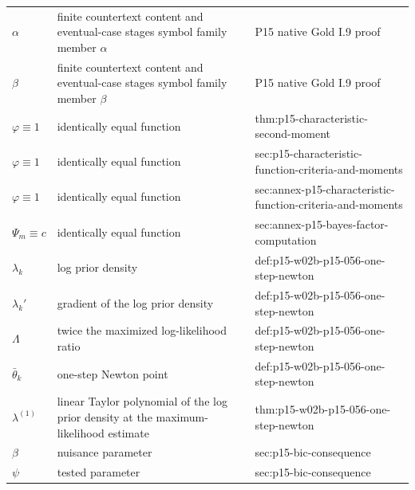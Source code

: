 \begin{longtable}{@{}p{}p{}p{}@{}}
\(\alpha\) & finite countertext content and eventual-case stages symbol family member \(\alpha\) & P15 native Gold I.\allowbreak{}9 proof \\
\(\beta\) & finite countertext content and eventual-case stages symbol family member \(\beta\) & P15 native Gold I.\allowbreak{}9 proof \\
\(\varphi\equiv 1\) & identically equal function & thm:\allowbreak{}p15-\allowbreak{}characteristic-\allowbreak{}second-\allowbreak{}moment \\
\(\varphi\equiv1\) & identically equal function & sec:\allowbreak{}p15-\allowbreak{}characteristic-\allowbreak{}function-\allowbreak{}criteria-\allowbreak{}and-\allowbreak{}moments \\
\(\varphi\equiv1\) & identically equal function & sec:\allowbreak{}annex-\allowbreak{}p15-\allowbreak{}characteristic-\allowbreak{}function-\allowbreak{}criteria-\allowbreak{}and-\allowbreak{}moments \\
\(\Psi_m\equiv c\) & identically equal function & sec:\allowbreak{}annex-\allowbreak{}p15-\allowbreak{}bayes-\allowbreak{}factor-\allowbreak{}computation \\
\(\lambda_k\) & log prior density & def:\allowbreak{}p15-\allowbreak{}w02b-\allowbreak{}p15-\allowbreak{}056-\allowbreak{}one-\allowbreak{}step-\allowbreak{}newton \\
\(\lambda_k'\) & gradient of the log prior density & def:\allowbreak{}p15-\allowbreak{}w02b-\allowbreak{}p15-\allowbreak{}056-\allowbreak{}one-\allowbreak{}step-\allowbreak{}newton \\
\(\Lambda\) & twice the maximized log-likelihood ratio & def:\allowbreak{}p15-\allowbreak{}w02b-\allowbreak{}p15-\allowbreak{}056-\allowbreak{}one-\allowbreak{}step-\allowbreak{}newton \\
\(\bar\theta_k\) & one-step Newton point & def:\allowbreak{}p15-\allowbreak{}w02b-\allowbreak{}p15-\allowbreak{}056-\allowbreak{}one-\allowbreak{}step-\allowbreak{}newton \\
\(\lambda^{(1)}\) & linear Taylor polynomial of the log prior density at the maximum-likelihood estimate & thm:\allowbreak{}p15-\allowbreak{}w02b-\allowbreak{}p15-\allowbreak{}056-\allowbreak{}one-\allowbreak{}step-\allowbreak{}newton \\
\(\beta\) & nuisance parameter & sec:\allowbreak{}p15-\allowbreak{}bic-\allowbreak{}consequence \\
\(\psi\) & tested parameter & sec:\allowbreak{}p15-\allowbreak{}bic-\allowbreak{}consequence \\

\end{longtable}
